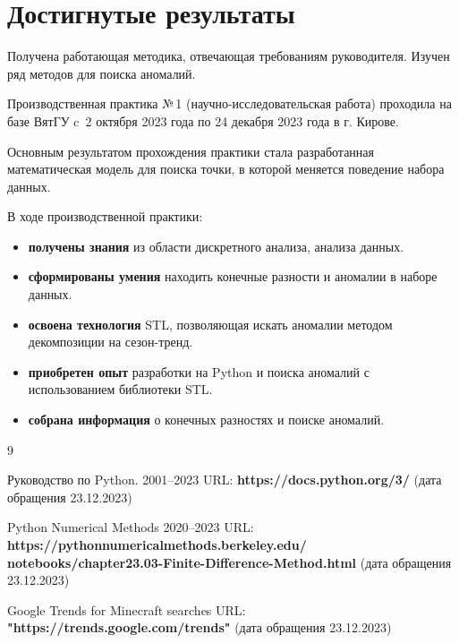 \documentclass[14pt,Otchet]{diplomwork}
\begin{document}
\section{Достигнутые результаты}
Получена работающая методика, отвечающая требованиям руководителя. Изучен ряд методов для поиска аномалий.




Производственная практика №\,1 (научно-исследовательская работа) проходила на базе ВятГУ c~2 октября 2023 года по 24 декабря 2023 года в г. Кирове.

Основным результатом прохождения практики стала разработанная
математическая модель для поиска точки, в которой меняется поведение
набора данных.

В ходе производственной практики:

\begin{itemize}
	\item \textbf{получены знания} из области дискретного анализа, анализа данных.
	\item \textbf{сформированы умения} находить конечные разности и аномалии в наборе данных.
	\item \textbf{освоена технология} STL, позволяющая искать аномалии методом декомпозиции на сезон-тренд.
	\item \textbf{приобретен опыт} разработки на Python и поиска аномалий с использованием библиотеки STL.
	\item \textbf{собрана информация} о конечных разностях и поиске аномалий.
\end{itemize}








\begin{thebibliography}{9}
\label{sec:bib}

Руководство по Python. 2001--2023 URL: \textbf{https://docs.python.org/3/} (дата обращения 23.12.2023)

Python Numerical Methods 2020--2023 URL: \textbf{https://pythonnumericalmethods.berkeley.edu/
notebooks/chapter23.03-Finite-Difference-Method.html}
(дата обращения 23.12.2023)

Google Trends for Minecraft searches URL: \textbf{"https://trends.google.com/trends"}
(дата обращения 23.12.2023)


\end{thebibliography}
\end{document}
